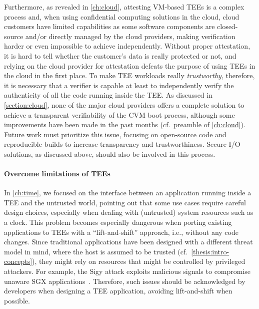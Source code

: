 Furthermore, as revealed in \cref{ch:cloud}, attesting \acs{VM}-based \acp{TEE}
is a complex process and, when using confidential computing solutions in the
cloud, cloud customers have limited capabilities as some software components are
closed-source and/or directly managed by the cloud providers, making
verification harder or even impossible to achieve independently. Without proper
attestation, it is hard to tell whether the customer's data is really protected
or not, and relying on the cloud provider for attestation defeats the purpose of
using \acp{TEE} in the cloud in the first place. To make \ac{TEE} workloads
really \emph{trustworthy}, therefore, it is necessary that a verifier is capable
at least to independently verify the authenticity of all the code running inside
the \ac{TEE}. As discussed in \cref{section:cloud}, none of the major cloud
providers offers a complete solution to achieve a transparent verifiability of
the \acs{CVM} boot process, although some improvements have been made in
the past months (cf.~preamble of \cref{ch:cloud}). Future work must prioritize
this issue, focusing on open-source code and reproducible builds to increase
transparency and trustworthiness. Secure I/O solutions, as discussed above,
should also be involved in this process.

\paragraph{Overcome limitations of TEEs}

In \cref{ch:time}, we focused on the interface between an application running
inside a \ac{TEE} and the untrusted world, pointing out that some use cases
require careful design choices, especially when dealing with (untrusted) system
resources such as a clock. This problem becomes especially dangerous when
porting existing applications to \acp{TEE} with a ``lift-and-shift'' approach,
i.e., without any code changes. Since traditional applications have been
designed with a different threat model in mind, where the host is assumed to be
trusted (cf.~\cref{thesis:intro-concepts}), they might rely on resources that
might be controlled by privileged attackers. For example, the Sigy attack
exploits malicious signals to compromise unaware \ac{SGX}
applications~\cite{sridhara2024sigy}. Therefore, such issues should be
acknowledged by developers when designing a \ac{TEE} application, avoiding
lift-and-shift when possible.

